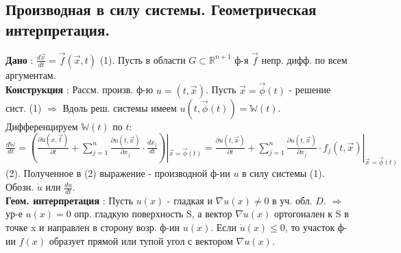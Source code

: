 \documentclass[unicode, 8pt, a4paper,oneside, landscape]{article}
\begin{document}
\begin{multicols}{4}
\subsection{Производная в силу системы. Геометрическая интерпретация.}

{\bf Дано} : $\frac{d\vec{x}}{dt} = \vec{f}(\vec{x}, t)$ (1). Пусть в области $G \subset \mathbb{R}^{n+1}$ ф-я $\vec{f}$ непр. дифф. по всем аргументам.\\
{\bf Конструкция} : Рассм. произв. ф-ю $u = (t, \vec{x})$. Пусть $\vec{x} = \vec{\phi}(t)$ - решение сист. (1) $\Rightarrow$ Вдоль реш. системы имеем $u(t, \vec{\phi}(t)) = \mathbb{W}(t)$. Дифференцируем $\mathbb{W}(t)$ по $t$: $\frac{d\mathbb{W}}{dt} = (\frac{\partial u(x, \vec{t})}{\partial t} + \sum_{j=1}^n\frac{\partial u(t, \vec{x})}{\partial x_j} \cdot \frac{dx_j}{dt})|_{\vec{x} = \vec{\phi}(t)} = \frac{\partial u(t, \vec{x})}{\partial t} + \sum_{j=1}^n \frac{\partial u(t, \vec{x})}{\partial x_j} \cdot f_j(t, \vec{x})|_{\vec{x} = \vec{\phi}(t)}$ (2). Полученное в (2) выражение - производной ф-ии $u$ в силу системы (1). Обозн. $\dot{u}$ или $\frac{du}{dt}$.\\
{\bf Геом. интерпретация} : Пусть $u(x)$ - гладкая и $\nabla u(x) \neq 0$ в уч. обл. $D$. $\Rightarrow$ ур-е $u(x) = 0$ опр. гладкую поверхность S, а вектор $\nabla u(x)$ ортогонален к S в точке x и направлен в сторону возр. ф-ии $u(x)$. Если $\dot{u}(x) \leq 0$, то участок ф-ии $f(x)$ образует прямой или тупой угол с вектором $\nabla u(x)$.



\end{multicols}
\end{document}
